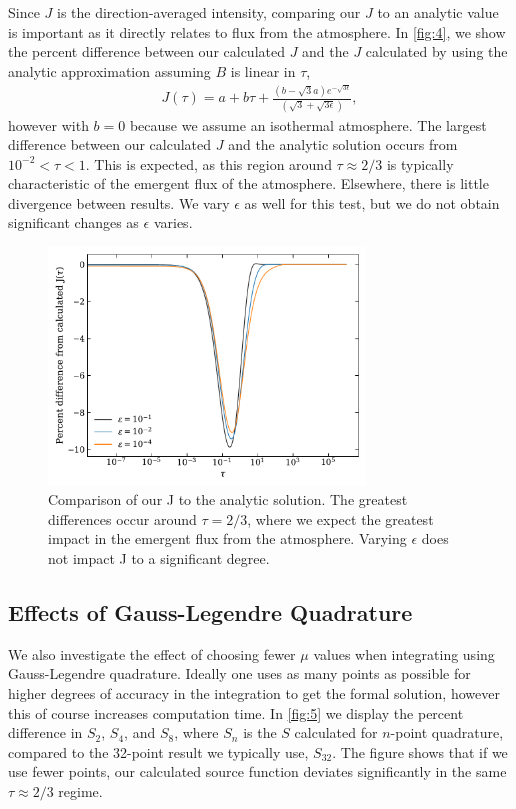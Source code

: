 \documentclass[12pt]{article}
\begin{document}
Since $J$ is the direction-averaged intensity, comparing our $J$ to an analytic value is important as it directly relates to flux from the atmosphere. In \autoref{fig:4}, we show the percent difference between our calculated $J$ and the $J$ calculated by using the analytic approximation assuming $B$ is linear in $\tau$,
\begin{align}
J(\tau) = a + b\tau + \frac{(b - \sqrt{3}a)e^{-\sqrt{3\epsilon}}}{(\sqrt{3}+\sqrt{3\epsilon})},
\label{eq:24}
\end{align}
however with $b = 0$ because we assume an isothermal atmosphere. The largest difference between our calculated $J$ and the analytic solution occurs from $10^{-2} < \tau < 1$. This is expected, as this region around $\tau \approx 2/3$ is typically characteristic of the emergent flux of the atmosphere. Elsewhere, there is little divergence between results. We vary $\epsilon$ as well for this test, but we do not obtain significant changes as $\epsilon$ varies.

\begin{figure}[ht]
 \centering
 \includegraphics[width=0.75\textwidth]{J_comparison.pdf}
 \caption{Comparison of our J to the analytic solution. The greatest differences occur around $\tau = 2/3$, where we expect the greatest impact in the emergent flux from the atmosphere. Varying $\epsilon$ does not impact J to a significant degree.}
 \label{fig:4}
\end{figure}


\subsection{Effects of Gauss-Legendre Quadrature}
\label{sec:quad}


We also investigate the effect of choosing fewer $\mu$ values when integrating using Gauss-Legendre quadrature. Ideally one uses as many points as possible for higher degrees of accuracy in the integration to get the formal solution, however this of course increases computation time. In \autoref{fig:5} we display the percent difference in $S_2$, $S_4$, and $S_8$, where $S_n$ is the $S$ calculated for $n$-point quadrature, compared to the 32-point result we typically use, $S_{32}$. The figure shows that if we use fewer points, our calculated source function deviates significantly in the same $\tau \approx 2/3$ regime.
\end{document}
